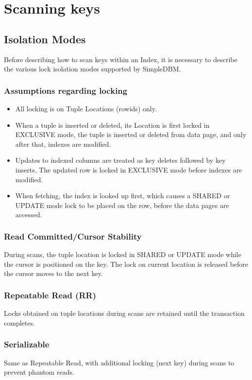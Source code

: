 \documentclass[a4paper,draft,oneside]{book}
\begin{document}
\section{Scanning keys}

\subsection{Isolation Modes}

Before describing how to scan keys within an Index, it is necessary to
describe the various lock isolation modes supported by SimpleDBM.

\subsubsection{Assumptions regarding locking}

\begin{itemize}
\item All locking is on Tuple Locations (rowids) only.
\item When a tuple is inserted or deleted, its Location is first
  locked in EXCLUSIVE mode, the tuple is inserted or deleted from data
  page, and only after that, indexes are modified.
\item Updates to indexed columns are treated as key deletes followed
  by key inserts. The updated row is locked in EXCLUSIVE mode before
  indexes are modified.
\item When fetching, the index is looked up first, which causes a
  SHARED or UPDATE mode lock to be placed on the row, before the data
  pages are accessed.
\end{itemize}

\subsubsection{Read Committed/Cursor Stability}

During scans, the tuple location is locked in SHARED or UPDATE mode
while the cursor is positioned on the key. The lock on current
location is released before the cursor moves to the next key.

\subsubsection{Repeatable Read (RR)}

Locks obtained on tuple locations during scans are retained until
the transaction completes.

\subsubsection{Serializable}

Same as Repeatable Read, with additional locking (next key) during
scans to prevent phantom reads.
\end{document}

